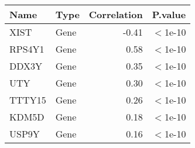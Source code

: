 \begin{tabular}{llrl}
  \hline
Name & Type & Correlation & P.value \\ 
  \hline
XIST & Gene & -0.41 & $<$1e-10 \\ 
  RPS4Y1 & Gene & 0.58 & $<$1e-10 \\ 
  DDX3Y & Gene & 0.35 & $<$1e-10 \\ 
  UTY & Gene & 0.30 & $<$1e-10 \\ 
  TTTY15 & Gene & 0.26 & $<$1e-10 \\ 
  KDM5D & Gene & 0.18 & $<$1e-10 \\ 
  USP9Y & Gene & 0.16 & $<$1e-10 \\ 
   \hline
\end{tabular}
